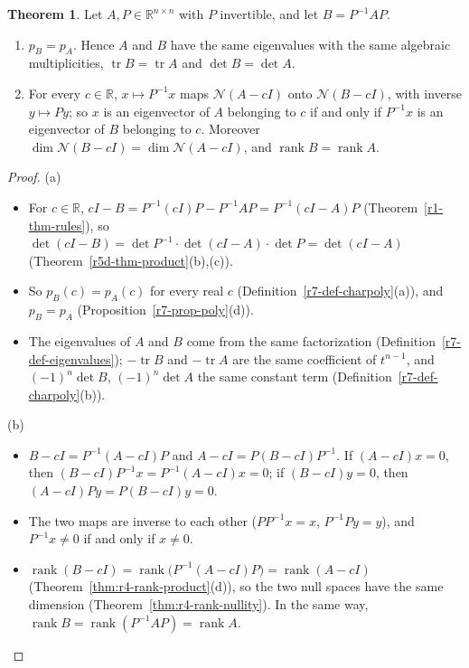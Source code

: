 \documentclass[12pt]{article}
\newcommand{\R}{\mathbb R}
\DeclareMathOperator{\tr}{tr}
\DeclareMathOperator{\rank}{rank}
\theoremstyle{definition}
\newtheorem{theorem}{Theorem}
\begin{document}
\begin{theorem}\label{r7-thm-similar}
Let \(A,P\in\R^{n\times n}\) with \(P\) invertible, and let \(B=P^{-1}AP\).
\begin{enumerate}
\item \(p_B=p_A\). Hence \(A\) and \(B\) have the same eigenvalues with the same algebraic multiplicities, \(\tr B=\tr A\)
and \(\det B=\det A\).
\item For every \(c\in\R\), \(x\mapsto P^{-1}x\) maps \(\mathcal N(A-cI)\) onto \(\mathcal N(B-cI)\), with inverse
\(y\mapsto Py\); so \(x\) is an eigenvector of \(A\) belonging to \(c\) if and only if \(P^{-1}x\) is an eigenvector of \(B\)
belonging to \(c\). Moreover \(\dim\mathcal N(B-cI)=\dim\mathcal N(A-cI)\), and \(\rank B=\rank A\).
\end{enumerate}
\end{theorem}
\begin{proof}
(a)
\begin{itemize}
\item For \(c\in\R\), \(cI-B=P^{-1}(cI)P-P^{-1}AP=P^{-1}(cI-A)P\) (Theorem~\ref{r1-thm-rules}), so
\(\det(cI-B)=\det P^{-1}\cdot\det(cI-A)\cdot\det P=\det(cI-A)\) (Theorem~\ref{r5d-thm-product}(b),(c)).
\item So \(p_B(c)=p_A(c)\) for every real \(c\) (Definition~\ref{r7-def-charpoly}(a)), and \(p_B=p_A\)
(Proposition~\ref{r7-prop-poly}(d)).
\item The eigenvalues of \(A\) and \(B\) come from the same factorization (Definition~\ref{r7-def-eigenvalues}); \(-\tr B\)
and \(-\tr A\) are the same coefficient of \(t^{n-1}\), and \((-1)^n\det B\), \((-1)^n\det A\) the same constant term
(Definition~\ref{r7-def-charpoly}(b)).
\end{itemize}
(b)
\begin{itemize}
\item \(B-cI=P^{-1}(A-cI)P\) and \(A-cI=P(B-cI)P^{-1}\). If \((A-cI)x=0\), then \((B-cI)P^{-1}x=P^{-1}(A-cI)x=0\); if
\((B-cI)y=0\), then \((A-cI)Py=P(B-cI)y=0\).
\item The two maps are inverse to each other (\(PP^{-1}x=x\), \(P^{-1}Py=y\)), and \(P^{-1}x\ne0\) if and only if \(x\ne0\).
\item \(\rank(B-cI)=\rank\bigl(P^{-1}(A-cI)P\bigr)=\rank(A-cI)\) (Theorem~\ref{thm:r4-rank-product}(d)), so the two null
spaces have the same dimension (Theorem~\ref{thm:r4-rank-nullity}). In the same way,
\(\rank B=\rank(P^{-1}AP)=\rank A\).\qedhere
\end{itemize}
\end{proof}
\end{document}
